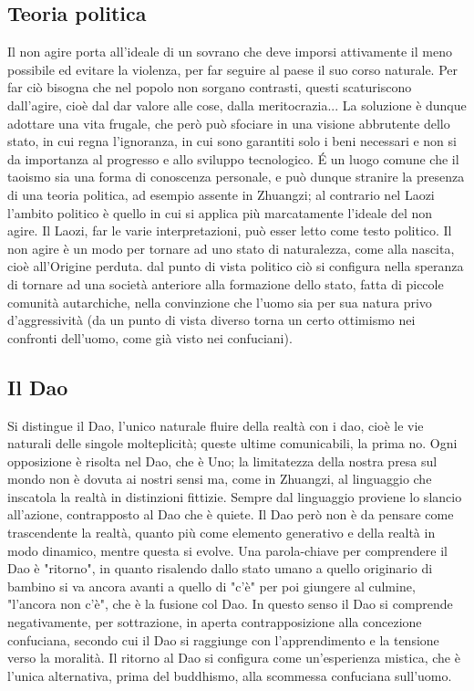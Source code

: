 \documentclass[10pt,a4paper]{report}
\begin{document}
\subsection{Teoria politica}
Il non agire porta all'ideale di un sovrano che deve imporsi attivamente il meno possibile ed evitare la violenza, per far seguire al paese il suo corso naturale. Per far ciò bisogna che nel popolo non sorgano contrasti, questi scaturiscono dall'agire, cioè dal dar valore alle cose, dalla meritocrazia... La soluzione è dunque adottare una vita frugale, che però può sfociare in una visione abbrutente dello stato, in cui regna l'ignoranza, in cui sono garantiti solo i beni necessari e non si da importanza al progresso e allo sviluppo tecnologico. \'E un luogo comune che il taoismo sia una forma di conoscenza personale, e può dunque stranire la presenza di una teoria politica, ad esempio assente in Zhuangzi; al contrario nel Laozi l'ambito politico è quello in cui si applica più marcatamente l'ideale del non agire. Il Laozi, far le varie interpretazioni, può esser letto come testo politico. Il non agire è un modo per tornare ad uno stato di naturalezza, come alla nascita, cioè all'Origine perduta. dal punto di vista politico ciò si configura nella speranza di tornare ad una società anteriore alla formazione dello stato, fatta di piccole comunità autarchiche, nella convinzione che l'uomo sia per sua natura privo d'aggressività (da un punto di vista diverso torna un certo ottimismo nei confronti dell'uomo, come già visto nei confuciani). 
\subsection{Il Dao}
Si distingue il Dao, l'unico naturale fluire della realtà con i dao, cioè le vie naturali delle singole molteplicità; queste ultime comunicabili, la prima no. Ogni opposizione è risolta nel Dao, che è Uno; la limitatezza della nostra presa sul mondo non è dovuta ai nostri sensi ma, come in Zhuangzi, al linguaggio che inscatola la realtà in distinzioni fittizie. Sempre dal linguaggio proviene lo slancio all'azione, contrapposto al Dao che è quiete. Il Dao però non è da pensare come trascendente la realtà, quanto più come elemento generativo e della realtà in modo dinamico, mentre questa si evolve. Una parola-chiave per comprendere il Dao è "ritorno", in quanto risalendo dallo stato umano a quello originario di bambino si va ancora avanti a quello di "c'è" per poi giungere al culmine, "l'ancora non c'è", che è la fusione col Dao. In questo senso il Dao si comprende negativamente, per sottrazione, in aperta contrapposizione alla concezione confuciana, secondo cui il Dao si raggiunge con l'apprendimento e la tensione verso la moralità. Il ritorno al Dao si configura come un'esperienza mistica, che è l'unica alternativa, prima del buddhismo, alla scommessa confuciana sull'uomo.   
\end{document}
